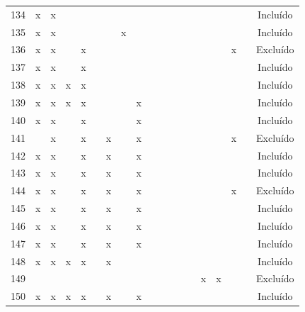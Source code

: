 \documentclass[
	12pt,				%
	oneside,			%
	a4paper,			%
	english,			%
	brazil				%
	]{abntex2ppgsi}
\begin{document}
\begin{apendicesenv}
\begin{table}[H]
\begin{tabular}{c | c c c c c c c c | c c c c c c c c c | c}
134 & x & x &   &   &   &   &   &   &   &   &   &   &   &   &   &   &   & Incluído \\
135 & x & x &   &   &   &   & x &   &   &   &   &   &   &   &   &   &   & Incluído \\
136 & x & x &   & x &   &   &   &   &   &   &   &   &   &   &   & x &   & Excluído \\
137 & x & x &   & x &   &   &   &   &   &   &   &   &   &   &   &   &   & Incluído \\
138 & x & x & x & x &   &   &   &   &   &   &   &   &   &   &   &   &   & Incluído \\
139 & x & x & x & x &   &   &   & x &   &   &   &   &   &   &   &   &   & Incluído \\
140 & x & x &   & x &   &   &   & x &   &   &   &   &   &   &   &   &   & Incluído \\
141 &   & x &   & x &   & x &   & x &   &   &   &   &   &   &   & x &   & Excluído \\
142 & x & x &   & x &   & x &   & x &   &   &   &   &   &   &   &   &   & Incluído \\
143 & x & x &   & x &   & x &   & x &   &   &   &   &   &   &   &   &   & Incluído \\
144 & x & x &   & x &   & x &   & x &   &   &   &   &   &   &   & x &   & Excluído \\
145 & x & x &   & x &   & x &   & x &   &   &   &   &   &   &   &   &   & Incluído \\
146 & x & x &   & x &   & x &   & x &   &   &   &   &   &   &   &   &   & Incluído \\
147 & x & x &   & x &   & x &   & x &   &   &   &   &   &   &   &   &   & Incluído \\
148 & x & x & x & x &   & x &   &   &   &   &   &   &   &   &   &   &   & Incluído \\
149 &   &   &   &   &   &   &   &   &   &   &   &   &   & x & x &   &   & Excluído \\
150 & x & x & x & x &   & x &   & x &   &   &   &   &   &   &   &   &   & Incluído \\
\bottomrule
\end{tabular}
\end{table}


\end{apendicesenv}
\end{document}
